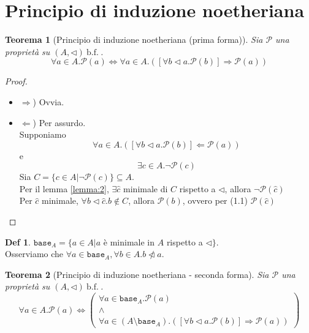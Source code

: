 \documentclass[a4paper]{report}
\newcommand{\bnfn}{\ \mathrm{b.f.}\ }
\newcommand{\prop}{\mathcal{P}}
\newcommand{\base}[1]{\mathtt{base}_{#1}}
\theoremstyle{definition} \newtheorem*{defi}{Def}
\theoremstyle{plain} \newtheorem{lemma}{Lemma}
\theoremstyle{plain} \newtheorem{teo}{Teorema}
\theoremstyle{remark} \newtheorem*{es}{Esempio}
\begin{document}
\section{Principio di induzione noetheriana}
\begin{teo}[Principio di induzione noetheriana (prima forma)]
  Sia $\prop$ una proprietà su $(A, \lhd) \bnfn$.\\
  \[
    \forall a \in A.\prop(a) \Leftrightarrow
    \forall a \in A.([\forall b \lhd a . \prop(b)]
    \Rightarrow \prop(a))
  \]
\end{teo}
\begin{proof}
  \begin{itemize}
    \item{$\Rightarrow$)} Ovvia.
    \item{$\Leftarrow$)} Per assurdo.\\
      Supponiamo
      \begin{equation}
        \forall a \in A.([\forall b \lhd a.\prop(b)]
        \Leftarrow \prop(a))
      \end{equation}
      e
      \begin{equation}
        \exists c \in A .\neg\prop(c)
      \end{equation}
      Sia $C=\{c \in A | \neg \prop(c)\} \subseteq A$.\\
      Per il lemma \ref{lemma:2}, $\exists \hat{c}$ minimale di $C$ rispetto a
      $\lhd$, allora $\neg \prop(\hat{c})$\\
      Per $\hat{c}$ minimale, $\forall b \lhd \hat{c}.b \not\in C$, allora
      $\prop(b)$, ovvero per (1.1) $\prop(\hat{c})$
  \end{itemize}
\end{proof}

\begin{defi}
  $\base{A}=\{a \in A | a$ è minimale in $A$ rispetto a $\lhd \}$.\\
  Osserviamo che $\forall a \in \base{A}, \forall b \in A . b \ntriangleleft a$.
\end{defi}

\begin{teo}[Principio di induzione noetheriana - seconda forma]
  Sia $\prop$ una proprietà su $(A, \lhd) \bnfn$.\\
  \[
    \forall a \in A.\prop(a) \Leftrightarrow
    \begin{pmatrix}
      \forall a \in \base{A}.\prop(a)\\
      \wedge\\
      \forall a \in (A \setminus \base{A})
      .([\forall b \lhd a . \prop(b)] \Rightarrow \prop(a))
    \end{pmatrix}
  \]
\end{teo}
\end{document}
